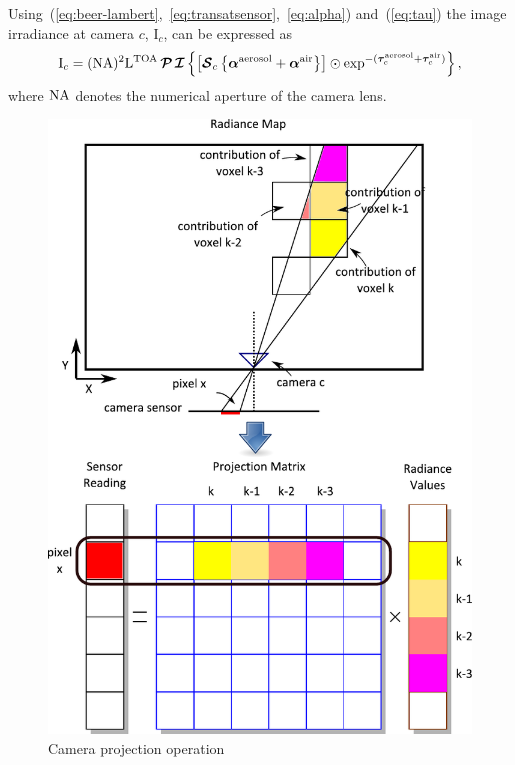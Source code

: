 \documentclass[10pt,twocolumn,letterpaper]{article}
\newcommand{\OpSphere}{\bm{\mathcal{S}}}
\newcommand{\OpInt}{\bm{\mathcal{I}}}
\newcommand{\OpCamera}{\bm{\mathcal{P}}}
\newcommand{\curly}[1]{\left\{#1\right\}}
\newcommand{\recty}[1]{\left[#1\right]}
\newcommand{\vect}[1]{\bm{#1}}
\begin{document}
Using~(\ref{eq:beer-lambert},~\ref{eq:transatsensor},~\ref{eq:alpha})
and~(\ref{eq:tau}) the image irradiance at camera $c$, $\mathrm{I}_c$,
can be expressed as
\begin{align}
  \mathrm{I}_c=({\rm NA})^2\mathrm{L}^{\rm TOA} \, \OpCamera \, \OpInt
  \curly{\recty{\OpSphere_c \curly{\vect{\alpha}^{\rm aerosol} +
        \vect{\alpha}^{\rm air}}} \odot \exp^{-(\vect{\tau}_c^{\rm
        aerosol} + \vect{\tau}_c^{\rm air})}},
  \label{eq:atsensor}
\end{align}
where $\rm{NA}$ denotes the numerical aperture of the camera lens.

\begin{figure}

  \centering
    \includegraphics[width=\columnwidth]{images/sensor.pdf}
  \caption{Camera projection operation}
  \label{fig:projection}
\end{figure}
\end{document}

